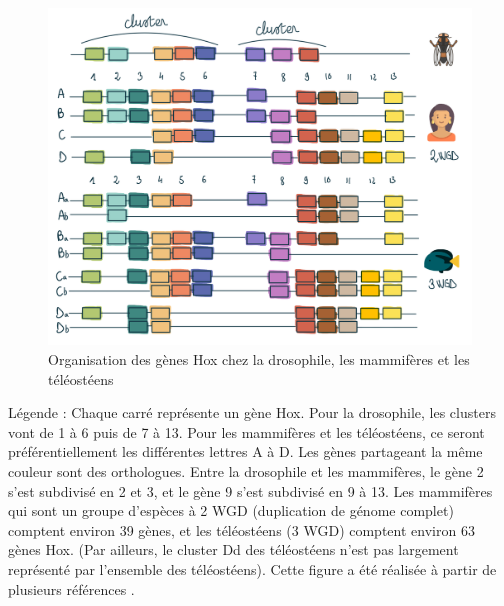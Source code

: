 \begin{figure}[H]
    \centering
    \includegraphics[width=1\textwidth]{figures/corps/figure3.png}
    \caption{Organisation des gènes Hox chez la drosophile, les mammifères et les téléostéens}
    \label{fig:3_hox}
\end{figure}
Légende : Chaque carré représente un gène Hox. Pour la drosophile, les clusters vont de 1 à 6 puis de 7 à 13. Pour les mammifères et les téléostéens, ce seront préférentiellement les différentes lettres A à D. Les gènes partageant la même couleur sont des orthologues. 
Entre la drosophile et les mammifères, le gène 2 s’est subdivisé en 2 et 3, et le gène 9 s’est subdivisé en 9 à 13. Les mammifères qui sont un groupe d’espèces à 2 WGD (duplication de génome complet) comptent environ 39 gènes, et les téléostéens (3 WGD) comptent environ 63 gènes Hox. (Par ailleurs, le cluster Dd des téléostéens n’est pas largement représenté par l’ensemble des téléostéens). Cette figure a été réalisée à partir de plusieurs références \cite{amores_zebrafish_1998, guo_hox_2010, lappin_hox_2006, rux_hox_2017}.

